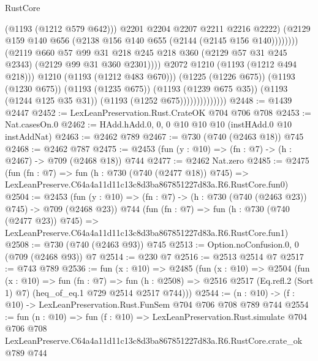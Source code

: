 \begin{lexlean}{RustCore}
\begin{coremodule}
                                                (@1193 (@1212 @579 @642)))
                                              @2201
                                              @2204
                                              @2207
                                              @2211
                                              @2216
                                              @2222)
                                            (@2129
                                              @159
                                              @140
                                              @656
                                              (@2138 @156 @140 @655 (@2144 (@2145 @156 @140))))))))
                                    (@2119
                                      @660
                                      @57
                                      @99
                                      @31
                                      @218
                                      @245
                                      @218
                                      @360
                                      (@2129 @57 @31 @245 @2343)
                                      (@2129 @99 @31 @360 @2301))))
                                @2072
                                @1210
                                (@1193 (@1212 @494 @218)))
                              @1210
                              (@1193 (@1212 @483 @670)))
                            (@1225 (@1226 @675))
                            (@1193 (@1230 @675))
                            (@1193 (@1235 @675))
                            (@1193 (@1239 @675 @35))
                            (@1193 (@1244 @125 @35 @31))
                            (@1193 (@1252 @675))))))))))))))
@2448 := @1439 @2447
@2452 := LexLeanPreservation.Rust.CrateOK @704 @706 @708
@2453 := Nat.casesOn.{0}
@2462 := HAdd.hAdd.{0, 0, 0} @10 @10 @10 (instHAdd.{0} @10 instAddNat)
@2463 := @2462 @789
@2467 := @730 (@740 (@2463 @18)) @745
@2468 := @2462 @787
@2475 := @2453 (fun (y : @10) => (fn : @7) -> (h : @2467) -> @709 (@2468 @18)) @744
@2477 := @2462 Nat.zero
@2485 := @2475
    (fun (fn : @7) =>
    fun (h : @730 (@740 (@2477 @18)) @745) =>
    LexLeanPreserve.C64a4a11d11c13c8d3ba867851227d83a.R6.RustCore.fun0)
@2504 := @2453
    (fun (y : @10) => (fn : @7) -> (h : @730 (@740 (@2463 @23)) @745) -> @709 (@2468 @23))
    @744
    (fun (fn : @7) =>
    fun (h : @730 (@740 (@2477 @23)) @745) =>
    LexLeanPreserve.C64a4a11d11c13c8d3ba867851227d83a.R6.RustCore.fun1)
@2508 := @730 (@740 (@2463 @93)) @745
@2513 := Option.noConfusion.{0, 0} (@709 (@2468 @93)) @7
@2514 := @230 @7
@2516 := @2513 @2514 @7
@2517 := @743 @789
@2536 := fun (x : @10) =>
  @2485
    (fun (x : @10) =>
    @2504
      (fun (x : @10) =>
      fun (fn : @7) =>
      fun (h : @2508) =>
      @2516 @2517 (Eq.refl.{2} (Sort 1) @7) (heq_of_eq.{1} @729 @2514 @2517 @744)))
@2544 := (n : @10) -> (f : @10) -> LexLeanPreservation.Rust.FunSem @704 @706 @708 @789 @744
@2554 := fun (n : @10) =>
  fun (f : @10) =>
  LexLeanPreservation.Rust.simulate
    @704
    @706
    @708
    LexLeanPreserve.C64a4a11d11c13c8d3ba867851227d83a.R6.RustCore.crate_ok
    @789
    @744
\end{coremodule}
\end{lexlean}
